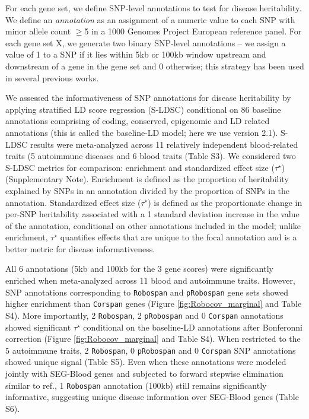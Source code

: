 \documentclass{bioinfo}
\def\Robospan{\texttt{Robospan}}
\def\pRobospan{\texttt{pRobospan}}
\def\Corspan{\texttt{Corspan}}
\begin{document}
For each gene set, we define  SNP-level annotations to test for disease heritability. We define an \emph{annotation} as an assignment of a numeric value to each SNP with minor allele count $\geq$5 in a 1000 Genomes Project European reference panel\cite{1000G2015, Finucane2015}. For each gene set X, we generate two binary SNP-level annotations -- we assign a value of 1 to a SNP if it lies within 5kb or 100kb window upstream and downstream of a gene in the gene set and 0 otherwise; this strategy has been used in several previous works\cite{Finucane2018, Kim2019, deLeeuw2015}.

We assessed the informativeness of SNP annotations for disease heritability by applying stratified LD score regression (S-LDSC)\cite{Finucane2015} conditional on 86 baseline annotations comprising of coding, conserved, epigenomic and LD related annotations (this is called the baseline-LD model; here we use version 2.1\cite{gazal2017}). S-LDSC results were meta-analyzed across 11 relatively independent blood-related traits (5 autoimmune diseases and 6 blood traits (Table S3).  We considered two S-LDSC metrics for comparison: enrichment and standardized effect size ($\tau^{\star}$) (Supplementary Note).  Enrichment is defined as the proportion of heritability explained by SNPs in an annotation divided by the proportion of SNPs in the annotation\cite{Finucane2015}. Standardized effect size ($\tau^{\star}$) is defined as the proportionate change in per-SNP heritability associated with a 1 standard deviation increase in the value of the annotation, conditional on other annotations included in the model\cite{gazal2017, Hormozdiari2018}; unlike enrichment, $\tau^{\star}$ quantifies effects that are unique to the focal annotation and is a better metric for disease informativeness\cite{dey2019, Kim2019, Finucane2018, Hormozdiari2018}. 


All $6$ annotations (5kb and 100kb for the 3 gene scores) were significantly enriched when meta-analyzed across 11 blood and autoimmune traits. However, SNP annotations corresponding to \Robospan{} and \pRobospan{} gene sets showed higher enrichment than  \Corspan{} genes (Figure \ref{fig:Robocov_marginal} and Table S4). More importantly, 2 \Robospan{}, 2 \pRobospan{} and 0 \Corspan{} annotations showed significant $\tau^{\star}$ conditional on the baseline-LD annotations after Bonferonni correction (Figure \ref{fig:Robocov_marginal} and Table S4). When restricted to the 5 autoimmune traits,  2 \Robospan{}, 0 \pRobospan{} and 0 \Corspan{} SNP annotations showed unique signal (Table S5). Even when these annotations were modeled jointly with SEG-Blood\cite{Finucane2018} genes and subjected to forward stepwise elimination similar to ref.\cite{Kim2019, dey2019}, 1 \Robospan{} annotation (100kb) still remains significantly informative, suggesting unique disease information over SEG-Blood genes (Table S6). 
\end{document}
